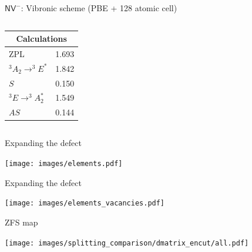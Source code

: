 \documentclass[notes=show]{beamer}
\begin{document}
\begin{frame}{ $ \mathsf{NV}^{-} $: Vibronic scheme (PBE + 128 atomic cell)}
{\begin{columns}
\begin{column}{0.3333\textwidth}
        \begin{center}
          \small
          \begin{tabular}{lc}
            \hline
            \multicolumn{2}{c}{Calculations}\\
            \hline
            ZPL & 1.693\\
            \hline
            $ ^3A_2 \to ^3E^{*} $  & 1.842\\
            \hline
            $ S $  & 0.150\\
            \hline
            $  ^3E \to ^3A_2^{*} $  & 1.549\\
            \hline
            $ AS $  & 0.144\\
            \hline
          \end{tabular}
        \end{center}
      \end{column}
    \end{columns}
    }
  \end{frame}

\begin{frame}{Expanding the defect}
  \begin{center}
    \texttt{[image: images/elements.pdf]}
  \end{center}
\end{frame}

\begin{frame}{Expanding the defect}
  \begin{center}
    \texttt{[image: images/elements\_vacancies.pdf]}
  \end{center}
\end{frame}

\begin{frame}{ZFS map}
  \begin{center}
    \texttt{[image: images/splitting\_comparison/dmatrix\_encut/all.pdf]}
  \end{center}
\end{frame}
\end{document}
